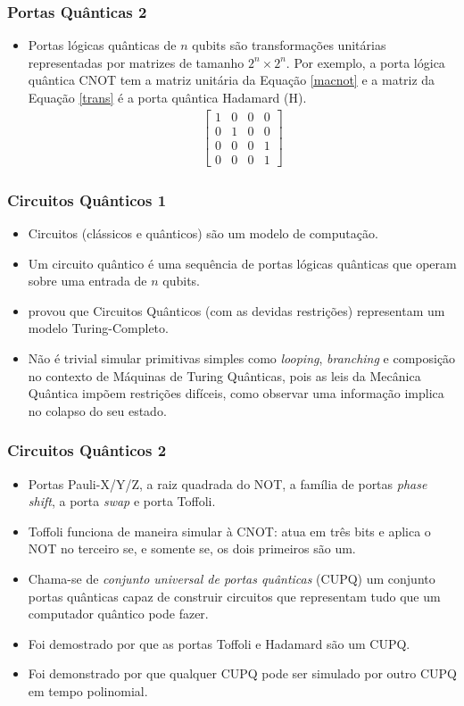 \documentclass{beamer}
\begin{document}
\begin{frame}
\frametitle{Portas Quânticas 2}
\begin{itemize}
  \item Portas lógicas quânticas de $n$ qubits são transformações unitárias
    representadas por matrizes de tamanho $2^n \times 2^n$. Por exemplo,
    a porta lógica quântica CNOT tem a matriz unitária da Equação
    \ref{macnot} e a matriz da Equação \ref{trans} é a porta quântica
    Hadamard (H).
    \begin{align}
      \label{macnot}
    \begin{bmatrix} 
    1 & 0 & 0 & 0 \\
    0 & 1 & 0 & 0 \\
    0 & 0 & 0 & 1 \\
    0 & 0 & 0 & 1
    \end{bmatrix}
    \end{align}
\end{itemize}
\end{frame}

\begin{frame}
\frametitle{Circuitos Quânticos 1}
\begin{itemize}
  \item Circuitos (clássicos e quânticos) são um modelo de computação.
  \item Um circuito quântico é uma sequência de portas lógicas quânticas que
    operam sobre uma entrada de $n$ qubits.
  \item  \cite{be:97} provou que Circuitos Quânticos (com as devidas restrições)
    representam um modelo Turing-Completo.
  \item Não é trivial simular primitivas simples como
    \textit{looping}, \textit{branching} e composição no contexto de
    Máquinas de Turing Quânticas, pois as leis da Mecânica Quântica
    impõem restrições difíceis, como observar uma informação implica
    no colapso do seu estado.
\end{itemize}
\end{frame}

\begin{frame}
\frametitle{Circuitos Quânticos 2}
\begin{itemize}
  \item Portas Pauli-X/Y/Z, a raiz quadrada do NOT, a família de portas
    \textit{phase shift}, a porta \textit{swap} e porta Toffoli.
  \item Toffoli funciona de maneira simular à CNOT: atua em três bits
    e aplica o NOT no terceiro se, e somente se, os dois primeiros são
    um.
  \item Chama-se de \textit{conjunto universal de portas quânticas}
    (CUPQ) um conjunto portas quânticas capaz de construir circuitos
    que representam tudo que um computador quântico pode fazer.
  \item Foi demostrado por \cite{shi:03} que as portas Toffoli e
    Hadamard são um CUPQ.
  \item Foi demonstrado por \cite{da:06} que qualquer CUPQ pode
    ser simulado por outro CUPQ em tempo polinomial.
\end{itemize}
\end{frame}
\end{document}
